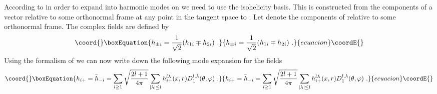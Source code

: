 \documentclass[a4paper,12pt]{article}
\begin{document}
According to \cite{Randjbar-Daemi:1982hi} in order to expand
\coordHE{} into harmonic modes on \coordHE{} we need to use  the isohelicity
\myHighlight{$\pm$}\coordHE{} basis. This is constructed from the components of a vector
relative to some orthonormal frame at any point in the tangent space
to \coordHE{}. Let \coordHE{} denote the components of \coordHE{}
relative to some orthonormal frame. The complex fields \coordHE{} are defined by
\begin{equation}\coord{}\boxEquation{
 h_{\pm i}= \frac{1}{\sqrt{2}}(h_{1i} \mp h_{2i})~.
}{
 h_{\pm i}= \frac{1}{\sqrt{2}}(h_{1i} \mp h_{2i})~.
}{ecuacion}\coordE{}\end{equation}
Using the formalism of
\cite{Randjbar-Daemi:1982hi,Randjbar-Daemi:1983bw}
we can now write down the following mode
expansion for the fields \coordHE{}
\begin{equation}\coord{}\boxEquation{
  h_{i+} = \bar h_{-i} =\sum_{l\geq
1}\sqrt{\frac{2l+1}{4\pi}}\sum_{\mid
  \lambda\mid\leq l} h_{i+} ^{l\lambda} (x, r)
  D_1 ^{l,\lambda}(\theta,\varphi)~.
}{
  h_{i+} = \bar h_{-i} =\sum_{l\geq
1}\sqrt{\frac{2l+1}{4\pi}}\sum_{\mid
  \lambda\mid\leq l} h_{i+} ^{l\lambda} (x, r)
  D_1 ^{l,\lambda}(\theta,\varphi)~.
}{ecuacion}\coordE{}\end{equation}
\end{document}
